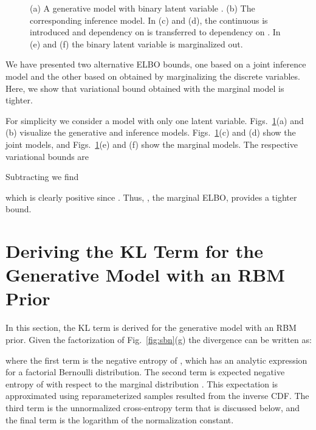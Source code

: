 \documentclass{article}
\begin{document}
\begin{figure}
{  
  }
  \caption{(a) A generative model with binary latent variable . (b) The corresponding inference model. In (c) and (d), the continuous  is introduced and dependency on  is transferred to dependency on . In (e) and (f)
  the binary latent variable  is marginalized out.}
  \label{fig:directed}
\end{figure}
We have presented two alternative ELBO bounds, one based on a joint inference model  and the other based on  obtained by marginalizing the discrete variables. Here, we show that variational bound obtained with the marginal model is tighter.

For simplicity we consider a model with only one latent variable. Figs.~\ref{fig:directed}(a) and (b) visualize the generative and inference models. Figs.~\ref{fig:directed}(c) and (d) show the joint models, and Figs.~\ref{fig:directed}(e) and (f) show the marginal models.
The respective variational bounds are


Subtracting we find 

which is clearly positive since . Thus, , the marginal ELBO, provides a tighter bound.

\iffalse
\section{Deriving the KL Term for the Generative Model with an RBM Prior}
\label{app:KLterm}

In this section, the KL term is derived for the generative model with an RBM prior. Given the factorization of Fig.~\ref{fig:sbn}(g) the  divergence can be written as:

where the first term is the negative entropy of , which has an analytic expression
for a factorial Bernoulli distribution. The second term is expected negative entropy of  with respect to the marginal distribution . This expectation is
approximated using reparameterized samples resulted from the inverse CDF. The third term
is the unnormalized cross-entropy term that is discussed below, and the final term is the logarithm
of the normalization constant. 
\end{document}

